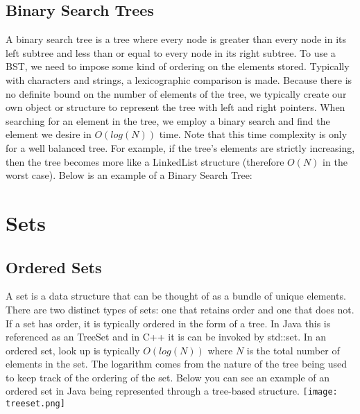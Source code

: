 \subsection{Binary Search Trees}
A binary search tree is a tree where every node is greater than every node in its left subtree and less than or equal to every node in its right subtree. To use a BST, we need to impose some kind of ordering on the elements stored. Typically with characters and strings, a lexicographic comparison is made. Because there is no definite bound on the number of elements of the tree, we typically create our own object or structure to represent the tree with left and right pointers. When searching for an element in the tree, we employ a binary search and find the element we desire in $O(log(N))$ time. Note that this time complexity is only for a well balanced tree. For example, if the tree's elements are strictly increasing, then the tree becomes more like a LinkedList structure (therefore $O(N)$ in the worst case). Below is an example of a Binary Search Tree:
\begin{center}
\end{center}


\section{Sets}
\subsection{Ordered Sets}
A set is a data structure that can be thought of as a bundle of unique elements. There are two distinct types of sets: one that retains order and one that does not. If a set has order, it is typically ordered in the form of a tree. In Java this is referenced as an TreeSet and in C++ it is can be invoked by std::set. In an ordered set, look up is typically $O(log(N))$ where $N$ is the total number of elements in the set. The logarithm comes from the nature of the tree being used to keep track of the ordering of the set. Below you can see an example of an ordered set in Java being represented through a tree-based structure.
\texttt{[image: treeset.png]}
